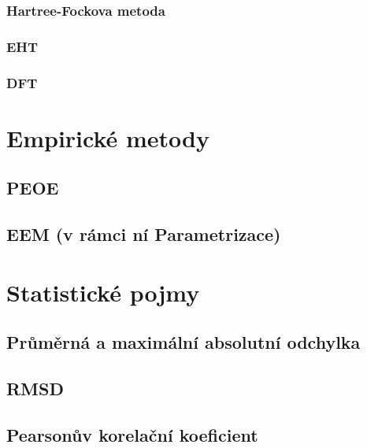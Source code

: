 \subsubsection{Hartree-Fockova metoda}
\subsubsection{EHT}
\subsubsection{DFT}
\section{Empirické metody}
\subsection{PEOE}
\subsection{EEM (v rámci ní Parametrizace)}
\section{Statistické pojmy}
\subsection{Průměrná a maximální absolutní odchylka}
\subsection{RMSD}
\subsection{Pearsonův korelační koeficient}



